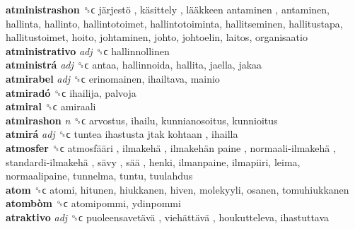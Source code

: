 \textbf{atministrashon} ␝ϲ   järjestö ,  käsittely ,  lääkkeen antaminen , antaminen, hallinta, hallinto, hallintotoimet, hallintotoiminta, hallitseminen, hallitustapa, hallitustoimet, hoito, johtaminen, johto, johtoelin, laitos, organisaatio  \\
\textbf{atministrativo} \emph{adj}  ␝ϲ  hallinnollinen  \\
\textbf{atministrá} \emph{adj}  ␝ϲ  antaa, hallinnoida, hallita, jaella, jakaa  \\
\textbf{atmirabel} \emph{adj}  ␝ϲ  erinomainen, ihailtava, mainio  \\
\textbf{atmiradó} ␝ϲ  ihailija, palvoja  \\
\textbf{atmiral} ␝ϲ  amiraali  \\
\textbf{atmirashon} \emph{n}  ␝ϲ  arvostus, ihailu, kunnianosoitus, kunnioitus  \\
\textbf{atmirá} \emph{adj}  ␝ϲ   tuntea ihastusta jtak kohtaan , ihailla  \\
\textbf{atmosfer} ␝ϲ   atmosfääri ,  ilmakehä ,  ilmakehän paine ,  normaali-ilmakehä ,  standardi-ilmakehä ,  sävy ,  sää , henki, ilmanpaine, ilmapiiri, leima, normaalipaine, tunnelma, tuntu, tuulahdus  \\
\textbf{atom} ␝ϲ  atomi, hitunen, hiukkanen, hiven, molekyyli, osanen, tomuhiukkanen  \\
\textbf{atombòm} ␝ϲ  atomipommi, ydinpommi  \\
\textbf{atraktivo} \emph{adj}  ␝ϲ   puoleensavetävä ,  viehättävä , houkutteleva, ihastuttava  \\
